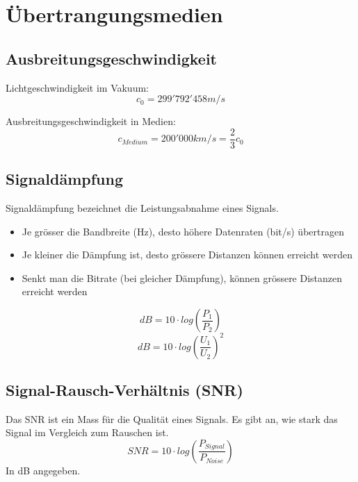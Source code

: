 \newpage
\section{Übertrangungsmedien}
\subsection{Ausbreitungsgeschwindigkeit}

{Lichtgeschwindigkeit im Vakuum:
    $$ c_0 = 299'792'458 m/s $$
}

{Ausbreitungsgeschwindigkeit in Medien: \\
    $$ c_{Medium} = 200'000 km/s = \frac{2}{3} c_0 $$}

\WhiteSpace


\subsection{Signaldämpfung}{
    Signaldämpfung bezeichnet die Leistungsabnahme eines Signals.
    \begin{itemize}[noitemsep]
        \item Je grösser die Bandbreite (Hz), desto höhere Datenraten (bit/s) übertragen
        \item Je kleiner die Dämpfung ist, desto grössere Distanzen können erreicht werden
        \item Senkt man die Bitrate (bei gleicher Dämpfung), können grössere Distanzen erreicht werden
    \end{itemize}}
$$ dB = 10 \cdot log(\frac{P_1}{P_2})$$
$$ dB = 10 \cdot log(\frac{U_1}{U_2})^2$$

\subsection{Signal-Rausch-Verhältnis (SNR)}{
    {Das SNR ist ein Mass für die Qualität eines Signals. Es gibt an, wie stark das Signal im Vergleich zum Rauschen ist. }
    $$ SNR = 10 \cdot log(\frac{P_{Signal}}{P_{Noise}}) $$
    In dB  angegeben.
}
\columnbreak

